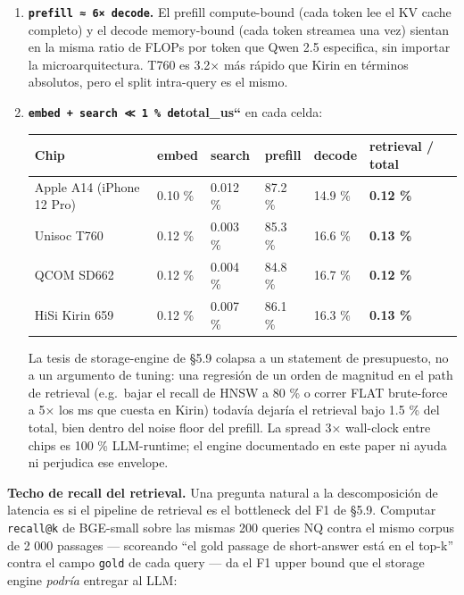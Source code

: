 \begin{enumerate}
\def\labelenumi{\arabic{enumi}.}
\item
  \textbf{\texttt{prefill\ ≈\ 6×\ decode}.} El prefill compute-bound (cada token
  lee el KV cache completo) y el decode memory-bound (cada token streamea una
  vez) sientan en la misma ratio de FLOPs por token que Qwen 2.5 especifica, sin
  importar la microarquitectura. T760 es 3.2× más rápido que Kirin en términos
  absolutos, pero el split intra-query es el mismo.
\item
  \textbf{\texttt{embed\ +\ search\ ≪\ 1\ \%\ de}total\_us``} en cada celda:

  {\def\LTcaptype{none} %
  \begin{longtable}[]{@{}llllll@{}}
  \toprule\noalign{}
  Chip & embed & search & prefill & decode & retrieval / total \\
  \midrule\noalign{}
  \endhead
  \bottomrule\noalign{}
  \endlastfoot
  Apple A14 (iPhone 12 Pro) & 0.10 \% & 0.012 \% & 87.2 \% & 14.9 \% &
  \textbf{0.12 \%} \\
  Unisoc T760 & 0.12 \% & 0.003 \% & 85.3 \% & 16.6 \% & \textbf{0.13 \%} \\
  QCOM SD662 & 0.12 \% & 0.004 \% & 84.8 \% & 16.7 \% & \textbf{0.12 \%} \\
  HiSi Kirin 659 & 0.12 \% & 0.007 \% & 86.1 \% & 16.3 \% & \textbf{0.13 \%} \\
  \end{longtable}
  }

  La tesis de storage-engine de §5.9 colapsa a un statement de presupuesto, no a
  un argumento de tuning: una regresión de un orden de magnitud en el path de
  retrieval (e.g.~bajar el recall de HNSW a 80 \% o correr FLAT brute-force a 5×
  los ms que cuesta en Kirin) todavía dejaría el retrieval bajo 1.5 \% del
  total, bien dentro del noise floor del prefill. La spread 3× wall-clock entre
  chips es 100 \% LLM-runtime; el engine documentado en este paper ni ayuda ni
  perjudica ese envelope.
\end{enumerate}

\textbf{Techo de recall del retrieval.} Una pregunta natural a la descomposición
de latencia es si el pipeline de retrieval es el bottleneck del F1 de §5.9.
Computar \texttt{recall@k} de BGE-small sobre las mismas 200 queries NQ contra
el mismo corpus de 2 000 passages --- scoreando ``el gold passage de
short-answer está en el top-k'' contra el campo \texttt{gold} de cada query ---
da el F1 upper bound que el storage engine \emph{podría} entregar al LLM:

